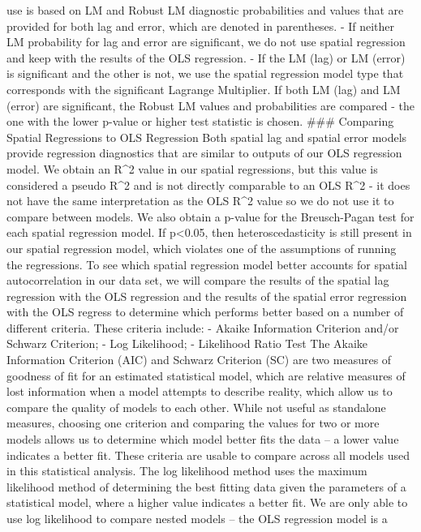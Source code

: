 \documentclass[
]{article}
\begin{document}
use is based on LM and Robust LM diagnostic probabilities and values
that are provided for both lag and error, which are denoted in
parentheses. - If neither LM probability for lag and error are
significant, we do not use spatial regression and keep with the results
of the OLS regression. - If the LM (lag) or LM (error) is significant
and the other is not, we use the spatial regression model type that
corresponds with the significant Lagrange Multiplier. If both LM (lag)
and LM (error) are significant, the Robust LM values and probabilities
are compared - the one with the lower p-value or higher test statistic
is chosen. \#\#\# Comparing Spatial Regressions to OLS Regression Both
spatial lag and spatial error models provide regression diagnostics that
are similar to outputs of our OLS regression model. We obtain an R\^{}2
value in our spatial regressions, but this value is considered a pseudo
R\^{}2 and is not directly comparable to an OLS R\^{}2 - it does not
have the same interpretation as the OLS R\^{}2 value so we do not use it
to compare between models. We also obtain a p-value for the
Breusch-Pagan test for each spatial regression model. If p\textless0.05,
then heteroscedasticity is still present in our spatial regression
model, which violates one of the assumptions of running the regressions.
To see which spatial regression model better accounts for spatial
autocorrelation in our data set, we will compare the results of the
spatial lag regression with the OLS regression and the results of the
spatial error regression with the OLS regress to determine which
performs better based on a number of different criteria. These criteria
include: - Akaike Information Criterion and/or Schwarz Criterion; - Log
Likelihood; - Likelihood Ratio Test The Akaike Information Criterion
(AIC) and Schwarz Criterion (SC) are two measures of goodness of fit for
an estimated statistical model, which are relative measures of lost
information when a model attempts to describe reality, which allow us to
compare the quality of models to each other. While not useful as
standalone measures, choosing one criterion and comparing the values for
two or more models allows us to determine which model better fits the
data -- a lower value indicates a better fit. These criteria are usable
to compare across all models used in this statistical analysis. The log
likelihood method uses the maximum likelihood method of determining the
best fitting data given the parameters of a statistical model, where a
higher value indicates a better fit. We are only able to use log
likelihood to compare nested models -- the OLS regression model is a
\end{document}
